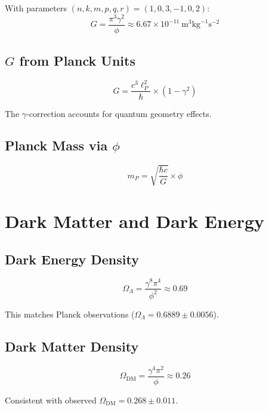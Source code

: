 \documentclass[12pt,a4paper]{article}
\begin{document}
With parameters $(n, k, m, p, q, r) = (1, 0, 3, -1, 0, 2)$:
\begin{equation}
G = \frac{\pi^3 \gamma^2}{\phi} \approx 6.67 \times 10^{-11}~\text{m}^3\text{kg}^{-1}\text{s}^{-2}
\end{equation}

\subsection{$G$ from Planck Units}

\begin{equation}
G = \frac{c^3 \ell_P^2}{\hbar} \times (1 - \gamma^2)
\end{equation}

The $\gamma$-correction accounts for quantum geometry effects.

\subsection{Planck Mass via $\phi$}

\begin{equation}
m_P = \sqrt{\frac{\hbar c}{G}} \times \phi
\end{equation}

\section{Dark Matter and Dark Energy}

\subsection{Dark Energy Density}

\begin{equation}
\Omega_\Lambda = \frac{\gamma^8 \pi^4}{\phi^2} \approx 0.69
\end{equation}

This matches Planck observations ($\Omega_\Lambda = 0.6889 \pm 0.0056$).

\subsection{Dark Matter Density}

\begin{equation}
\Omega_{\text{DM}} = \frac{\gamma^4 \pi^2}{\phi} \approx 0.26
\end{equation}

Consistent with observed $\Omega_{\text{DM}} = 0.268 \pm 0.011$.
\end{document}
